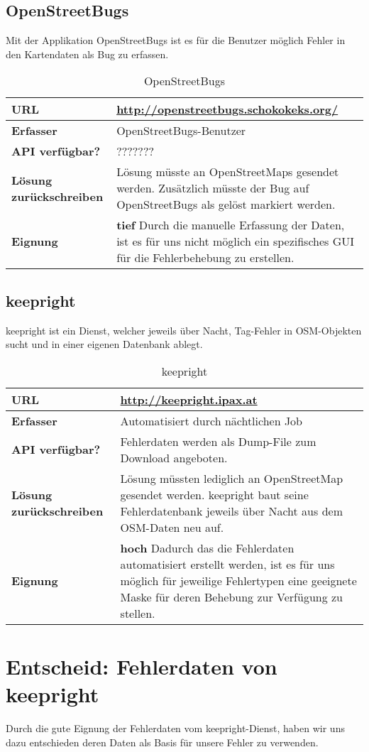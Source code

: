 \subsection{OpenStreetBugs}
Mit der Applikation OpenStreetBugs ist es für die Benutzer möglich Fehler in den Kartendaten als Bug zu erfassen.

\begin{table}[H]
\centering
\begin{tabular}{|p{0.25\twocelltabwidth}|p{0.75\twocelltabwidth}|}
\hline 
\textbf{URL} & \url{http://openstreetbugs.schokokeks.org/} \\
\hline 
\textbf{Erfasser} & OpenStreetBugs-Benutzer \\
\hline 
\textbf{API verfügbar?} & ??????? \\
\hline 
\textbf{Lösung zurückschreiben} & Lösung müsste an OpenStreetMaps gesendet werden. Zusätzlich  müsste der Bug auf OpenStreetBugs als gelöst markiert werden. \\
\hline
\textbf{Eignung} & \textbf{tief} \linebreak Durch die manuelle Erfassung der Daten, ist es für uns nicht möglich ein spezifisches GUI für die Fehlerbehebung zu erstellen. \\ 
\hline 
\end{tabular} 
\caption{OpenStreetBugs}
\label{datenquellen-openstreetbugs}
\end{table}

\subsection{keepright}
keepright ist ein Dienst, welcher jeweils über Nacht, Tag-Fehler in OSM-Objekten sucht und in einer eigenen Datenbank ablegt.

\begin{table}[H]
\centering
\begin{tabular}{|p{0.25\twocelltabwidth}|p{0.75\twocelltabwidth}|}
\hline 
\textbf{URL} & \url{http://keepright.ipax.at} \\
\hline 
\textbf{Erfasser} & Automatisiert durch nächtlichen Job \\
\hline 
\textbf{API verfügbar?} & Fehlerdaten werden als Dump-File zum Download angeboten. \\
\hline 
\textbf{Lösung zurückschreiben} & Lösung müssten lediglich an OpenStreetMap gesendet werden. keepright baut seine Fehlerdatenbank jeweils über Nacht aus dem OSM-Daten neu auf. \\
\hline
\textbf{Eignung} & \textbf{hoch} \linebreak Dadurch das die Fehlerdaten automatisiert erstellt werden, ist es für uns möglich für jeweilige Fehlertypen eine geeignete Maske für deren Behebung zur Verfügung zu stellen. \\
\hline
\end{tabular}
\caption{keepright}
\label{datenquellen-keepright}
\end{table}

\section{Entscheid: Fehlerdaten von keepright}
Durch die gute Eignung der Fehlerdaten vom keepright-Dienst, haben wir uns dazu entschieden deren Daten als Basis für unsere Fehler zu verwenden.